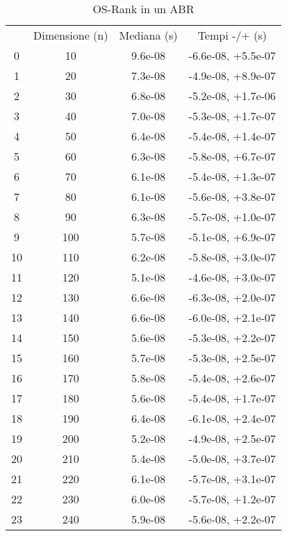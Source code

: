 \begin{table}
\centering
\caption{OS-Rank in un ABR}
\label{OS-Rank in un ABR}
\begin{adjustbox}{width=1\textwidth/2}
\begin{tabular}{|c|c|c|c|}
\hline
 & Dimensione (n) & Mediana (s) & Tempi -/+ (s) \\
0 & 10 & 9.6e-08 & -6.6e-08, +5.5e-07 \\
\cline{1-4}
1 & 20 & 7.3e-08 & -4.9e-08, +8.9e-07 \\
\cline{1-4}
2 & 30 & 6.8e-08 & -5.2e-08, +1.7e-06 \\
\cline{1-4}
3 & 40 & 7.0e-08 & -5.3e-08, +1.7e-07 \\
\cline{1-4}
4 & 50 & 6.4e-08 & -5.4e-08, +1.4e-07 \\
\cline{1-4}
5 & 60 & 6.3e-08 & -5.8e-08, +6.7e-07 \\
\cline{1-4}
6 & 70 & 6.1e-08 & -5.4e-08, +1.3e-07 \\
\cline{1-4}
7 & 80 & 6.1e-08 & -5.6e-08, +3.8e-07 \\
\cline{1-4}
8 & 90 & 6.3e-08 & -5.7e-08, +1.0e-07 \\
\cline{1-4}
9 & 100 & 5.7e-08 & -5.1e-08, +6.9e-07 \\
\cline{1-4}
10 & 110 & 6.2e-08 & -5.8e-08, +3.0e-07 \\
\cline{1-4}
11 & 120 & 5.1e-08 & -4.6e-08, +3.0e-07 \\
\cline{1-4}
12 & 130 & 6.6e-08 & -6.3e-08, +2.0e-07 \\
\cline{1-4}
13 & 140 & 6.6e-08 & -6.0e-08, +2.1e-07 \\
\cline{1-4}
14 & 150 & 5.6e-08 & -5.3e-08, +2.2e-07 \\
\cline{1-4}
15 & 160 & 5.7e-08 & -5.3e-08, +2.5e-07 \\
\cline{1-4}
16 & 170 & 5.8e-08 & -5.4e-08, +2.6e-07 \\
\cline{1-4}
17 & 180 & 5.6e-08 & -5.4e-08, +1.7e-07 \\
\cline{1-4}
18 & 190 & 6.4e-08 & -6.1e-08, +2.4e-07 \\
\cline{1-4}
19 & 200 & 5.2e-08 & -4.9e-08, +2.5e-07 \\
\cline{1-4}
20 & 210 & 5.4e-08 & -5.0e-08, +3.7e-07 \\
\cline{1-4}
21 & 220 & 6.1e-08 & -5.7e-08, +3.1e-07 \\
\cline{1-4}
22 & 230 & 6.0e-08 & -5.7e-08, +1.2e-07 \\
\cline{1-4}
23 & 240 & 5.9e-08 & -5.6e-08, +2.2e-07 \\

\end{tabular}
\end{adjustbox}
\end{table}
